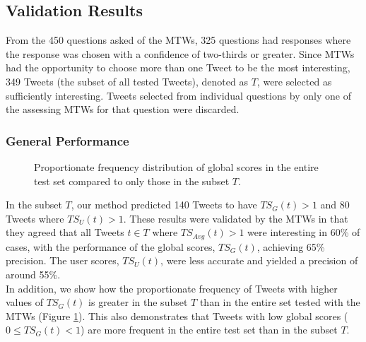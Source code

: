 \subsection{Validation Results}
From the 450 questions asked of the MTWs, 325 questions had responses where the response was chosen with a confidence of two-thirds or greater. Since MTWs had the opportunity to choose more than one Tweet to be the most interesting, 349 Tweets (the subset of all tested Tweets), denoted as $T$, were selected as sufficiently interesting. Tweets selected from individual questions by only one of the assessing MTWs for that question were discarded.

\subsubsection{General Performance}

\begin{figure}[h]
\centering{
\begin{tikzpicture}
\begin{semilogyaxis}[
    symbolic x coords={[0-1), [1-2), [2-3), [3-4), [4-5), [5-100)},
        ylabel=Proportionate frequency,
		xlabel=$TS_G(t)$,
        legend pos=north east,
        legend style={nodes=right},
        ybar,
        bar width=7pt,
        legend entries={ Chosen Tweets ($T$),  All Tested Tweets}
        ]
   \addplot[plot 0,bar group size={0}{2}]
        coordinates {([0-1),76.30057803) ([1-2),7.514450867)  ([2-3),4.335260116) ([3-4), 1.445086705) ([4-5), 2.023121387) ([5-100), 6.936416185)};
        \addplot[plot 1,bar group size={1}{2}]
        coordinates { ([0-1),80.94365552) ([1-2),6.596426935)  ([2-3),3.710490151) ([3-4), 1.099404489) ([4-5), 0.961978928) ([5-100), 4.634448007)};
        
\end{semilogyaxis}
\end{tikzpicture}
}
\caption{Proportionate frequency distribution of global scores in the entire test set compared to only those in the subset $T$.}
\label{fig:hist}
\end{figure}

In the subset $T$, our method predicted 140 Tweets to have $TS_G(t) > 1$ and 80 Tweets where $TS_U(t) > 1$.  These results were validated by the MTWs in that they agreed that all Tweets $t \in T$ where $TS_{Avg}(t) > 1$ were interesting in 60\% of cases, with the performance of the global scores, $TS_{G}(t)$, achieving 65\% precision. The user scores, $TS_{U}(t)$, were less accurate and yielded a precision of around 55\%.\\
In addition, we show how the proportionate frequency of Tweets with higher values of $TS_G(t)$ is greater in the subset $T$ than in the entire set tested with the MTWs (Figure \ref{fig:hist}). This also demonstrates that Tweets with low global scores ($0 \leq TS_G(t) < 1$) are more frequent in the entire test set than in the subset $T$.

